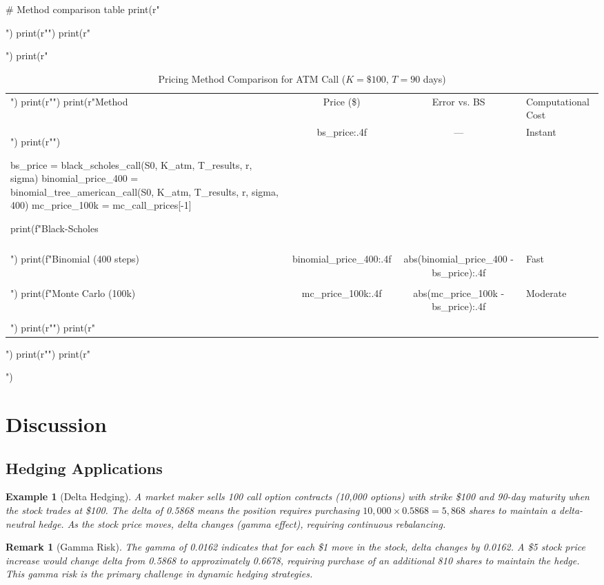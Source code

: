 \documentclass[a4paper, 11pt]{article}
\newtheorem{example}{Example}[section]
\newtheorem{remark}{Remark}[section]
\begin{document}
\begin{pycode}
# Method comparison table
print(r"\begin{table}[htbp]")
print(r"\centering")
print(r"\caption{Pricing Method Comparison for ATM Call ($K=\$100$, $T=90$ days)}")
print(r"\begin{tabular}{lccl}")
print(r"\toprule")
print(r"Method & Price (\$) & Error vs. BS & Computational Cost \\")
print(r"\midrule")

bs_price = black_scholes_call(S0, K_atm, T_results, r, sigma)
binomial_price_400 = binomial_tree_american_call(S0, K_atm, T_results, r, sigma, 400)
mc_price_100k = mc_call_prices[-1]

print(f"Black-Scholes & {bs_price:.4f} & --- & Instant \\\\")
print(f"Binomial (400 steps) & {binomial_price_400:.4f} & {abs(binomial_price_400 - bs_price):.4f} & Fast \\\\")
print(f"Monte Carlo (100k) & {mc_price_100k:.4f} & {abs(mc_price_100k - bs_price):.4f} & Moderate \\\\")
print(r"\bottomrule")
print(r"\end{tabular}")
print(r"\label{tab:methods}")
print(r"\end{table}")
\end{pycode}

\section{Discussion}

\subsection{Hedging Applications}

\begin{example}[Delta Hedging]
A market maker sells 100 call option contracts (10,000 options) with strike \$100 and 90-day maturity when the stock trades at \$100. The delta of 0.5868 means the position requires purchasing $10,000 \times 0.5868 = 5,868$ shares to maintain a delta-neutral hedge. As the stock price moves, delta changes (gamma effect), requiring continuous rebalancing.
\end{example}

\begin{remark}[Gamma Risk]
The gamma of 0.0162 indicates that for each \$1 move in the stock, delta changes by 0.0162. A \$5 stock price increase would change delta from 0.5868 to approximately 0.6678, requiring purchase of an additional 810 shares to maintain the hedge. This gamma risk is the primary challenge in dynamic hedging strategies.
\end{remark}
\end{document}
